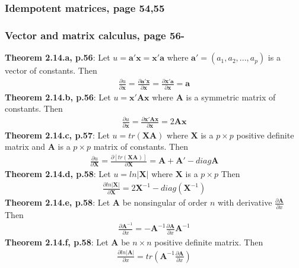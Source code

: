 \documentclass[]{article}
\begin{document}
\subsubsection{Idempotent matrices, page 54,55}


\subsubsection{Vector and matrix calculus, page 56-}
\textbf{Theorem 2.14.a, p.56}: Let $u=\pmb{a}'\pmb{x}=\pmb{x}'\pmb{a}$ where $\pmb{a}'=(a_1, a_2, ..., a_p)$ is a vector of constants. Then \\
$$
\begin{aligned}
	\frac{\partial u}{\partial\pmb{x}} = \frac{\partial \pmb{a}'\pmb{x}}{\partial\pmb{x}} = \frac{\partial \pmb{x}'\pmb{a}}{\partial\pmb{x}} = \pmb{a}
\end{aligned}
$$
\textbf{Theorem 2.14.b, p.56}: Let $u=\pmb{x}'\pmb{Ax}$ where $\pmb{A}$ is a symmetric matrix of constants. Then \\
$$
\begin{aligned}
	\frac{\partial u}{\partial\pmb{x}} = \frac{\partial \pmb{x}'\pmb{Ax}}{\partial\pmb{x}} = 2\pmb{Ax}
\end{aligned}
$$
\textbf{Theorem 2.14.c, p.57}: Let $u=tr(\pmb{XA})$ where $\pmb{X}$ is a $p\times p$ positive definite matrix and $\pmb{A}$ is a $p\times p$ matrix of constants. Then \\
$$
\begin{aligned}
	\frac{\partial u}{\partial\pmb{X}} = \frac{\partial [tr(\pmb{XA})]}{\partial\pmb{X}} = \pmb{A} + \pmb{A}' - diag\pmb{A}
\end{aligned}
$$
\textbf{Theorem 2.14.d, p.58}: Let $u=ln|\pmb{X}|$ where $\pmb{X}$ is a $p\times p$ Then \\
$$
\begin{aligned}
	\frac{\partial ln|\pmb{X}|}{\partial\pmb{X}} = 2\pmb{X}^{-1} - diag(\pmb{X}^{-1})
\end{aligned}
$$
\textbf{Theorem 2.14.e, p.58}: Let $\pmb{A}$ be nonsingular of order $n$ with derivative $\frac{\partial\pmb{A}}{\partial x}$ Then \\
$$
\begin{aligned}
	\frac{\partial \pmb{A}^{-1}}{\partial x} = -\pmb{A}^{-1} \frac{\partial \pmb{A}}{\partial x} \pmb{A}^{-1}
\end{aligned}
$$
\textbf{Theorem 2.14.f, p.58}: Let $\pmb{A}$ be $n\times n$ positive definite matrix. Then \\
$$
\begin{aligned}
	\frac{\partial ln|\pmb{A}|}{\partial x} = tr \left( \pmb{A}^{-1}\frac{\partial \pmb{A}}{\partial x}   \right)
\end{aligned}
$$
\end{document}
